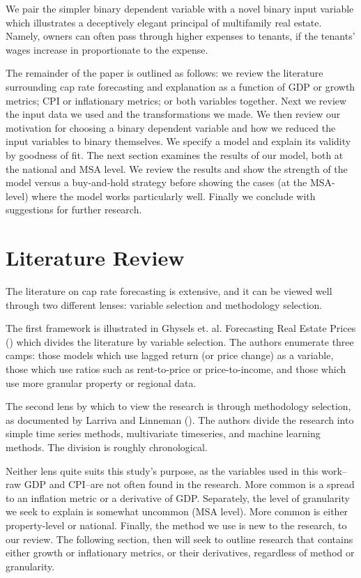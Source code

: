 We pair the simpler binary dependent variable with a novel binary input variable which illustrates a deceptively elegant principal of multifamily real estate. Namely, owners can often pass through higher expenses to tenants, if the tenants' wages increase in proportionate to the expense.

The remainder of the paper is outlined as follows: we review the literature surrounding cap rate forecasting and explanation as a function of GDP or growth metrics; CPI or inflationary metrics; or both variables together. Next we review the input data we used and the transformations we made. We then review our motivation for choosing a binary dependent variable and how we reduced the input variables to binary themselves. We specify a model and explain its validity by goodness of fit. The next section examines the results of our model, both at the national and MSA level. We review the results and show the strength of the model versus a buy-and-hold strategy before showing the cases (at the MSA-level) where the model works particularly well. Finally we conclude with suggestions for further research. 

\label{intro}


\section{Literature Review}

The literature on cap rate forecasting is extensive, and it can be viewed well through two different lenses: variable selection and methodology selection. 

The first framework is illustrated in Ghysels et. al. Forecasting Real Estate Prices (\citeyear{ghysels_plazzi_valkanov_torous_2013}) which divides the literature by variable selection. The authors enumerate three camps: those models which use lagged return (or price change) as a variable, those which use ratios such as rent-to-price or price-to-income, and those which use more granular property or regional data. 

The second lens by which to view the research is through methodology selection, as documented by Larriva and Linneman (\citeyear{larriva2021determinants}). The authors divide the research into simple time series methods, multivariate timeseries, and machine learning methods. The division is roughly chronological. 

Neither lens quite suits this study's purpose, as the variables used in this work--raw GDP and CPI--are not often found in the research. More common is a spread to an inflation metric or a derivative of GDP. Separately, the level of granularity we seek to explain is somewhat uncommon (MSA level). More common is either property-level or national. Finally, the method we use is new to the research, to our review. The following section, then will seek to outline research that contains either growth or inflationary metrics, or their derivatives, regardless of method or granularity.

